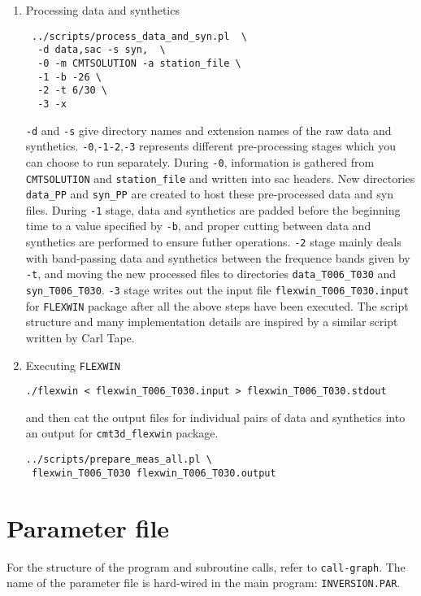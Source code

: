 \documentclass[12pt,titlepage,fleqn]{article}
\begin{document}
\begin{enumerate}
\item Processing data and synthetics
\begin{verbatim}
 ../scripts/process_data_and_syn.pl  \
  -d data,sac -s syn,  \
  -0 -m CMTSOLUTION -a station_file \
  -1 -b -26 \
  -2 -t 6/30 \
  -3 -x
\end{verbatim}
\verb=-d= and \verb=-s= give directory names and extension names of the raw data and synthetics. \verb=-0=,\verb=-1=\verb=-2=,\verb=-3= represents different pre-processing stages which you can choose to run separately. During \verb=-0=, information is gathered from \verb=CMTSOLUTION= and \verb=station_file= and written into sac headers. New directories \verb=data_PP= and \verb=syn_PP= are created to host these pre-processed data and syn files. During \verb=-1= stage, data and synthetics are padded before the beginning time to a value specified by \verb=-b=, and proper cutting between data and synthetics are performed to ensure futher operations. \verb=-2= stage mainly deals with band-passing data and synthetics between the frequence bands given by \verb=-t=, and moving the new processed files to directories \verb=data_T006_T030= and \verb=syn_T006_T030=. \verb=-3= stage writes out the input file \verb=flexwin_T006_T030.input= for \verb=FLEXWIN= package after all the above steps have been executed. The script structure and many implementation details are inspired by a similar script written by Carl Tape.

\item Executing \verb=FLEXWIN=
\begin{verbatim}
./flexwin < flexwin_T006_T030.input > flexwin_T006_T030.stdout
\end{verbatim}
and then cat the output files for individual pairs of data and synthetics into an output for \verb=cmt3d_flexwin= package.
\begin{verbatim}
../scripts/prepare_meas_all.pl \
 flexwin_T006_T030 flexwin_T006_T030.output
\end{verbatim}

\end{enumerate}


\section{Parameter file}

For the structure of the program and subroutine calls, refer to \verb=call-graph=. The name of the parameter file is hard-wired in the main program: \verb=INVERSION.PAR=.
\end{document}
